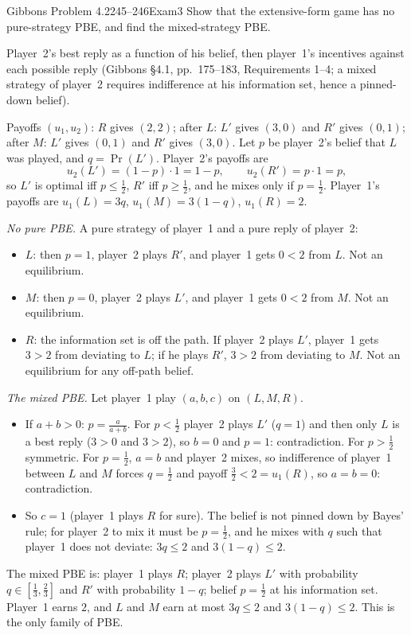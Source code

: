 \begin{exsol}{Gibbons Problem 4.2}{245--246}{Exam}{3}
\asked Show that the extensive-form game has no pure-strategy PBE, and find the mixed-strategy PBE.

\method Player~2's best reply as a function of his belief, then player~1's incentives against each
possible reply (Gibbons \S4.1, pp.~175--183, Requirements 1--4; a mixed strategy of player~2
requires indifference at his information set, hence a pinned-down belief).

\solution Payoffs $(u_1, u_2)$: $R$ gives $(2, 2)$; after $L$: $L'$ gives $(3, 0)$ and $R'$ gives
$(0, 1)$; after $M$: $L'$ gives $(0, 1)$ and $R'$ gives $(3, 0)$. Let $p$ be player~2's belief that
$L$ was played, and $q = \Pr(L')$. Player~2's payoffs are
\[
  u_2(L') = (1-p) \cdot 1 = 1 - p, \qquad u_2(R') = p \cdot 1 = p,
\]
so $L'$ is optimal iff $p \le \frac12$, $R'$ iff $p \ge \frac12$, and he mixes only if $p = \frac12$.
Player~1's payoffs are $u_1(L) = 3q$, $u_1(M) = 3(1-q)$, $u_1(R) = 2$.

\emph{No pure PBE.} A pure strategy of player~1 and a pure reply of player~2:
\begin{itemize}
  \item $L$: then $p = 1$, player~2 plays $R'$, and player~1 gets $0 < 2$ from $L$. Not an equilibrium.
  \item $M$: then $p = 0$, player~2 plays $L'$, and player~1 gets $0 < 2$ from $M$. Not an equilibrium.
  \item $R$: the information set is off the path. If player~2 plays $L'$, player~1 gets $3 > 2$
  from deviating to $L$; if he plays $R'$, $3 > 2$ from deviating to $M$. Not an equilibrium
  for any off-path belief.
\end{itemize}
\emph{The mixed PBE.} Let player~1 play $(a, b, c)$ on $(L, M, R)$.
\begin{itemize}
  \item If $a + b > 0$: $p = \frac{a}{a+b}$. For $p < \frac12$ player~2 plays $L'$ ($q = 1$) and then
  only $L$ is a best reply ($3 > 0$ and $3 > 2$), so $b = 0$ and $p = 1$: contradiction. For $p > \frac12$
  symmetric. For $p = \frac12$, $a = b$ and player~2 mixes, so indifference of player~1 between
  $L$ and $M$ forces $q = \frac12$ and payoff $\frac32 < 2 = u_1(R)$, so $a = b = 0$: contradiction.
  \item So $c = 1$ (player~1 plays $R$ for sure). The belief is not pinned down by Bayes' rule;
  for player~2 to mix it must be $p = \frac12$, and he mixes with $q$ such that player~1 does not
  deviate: $3q \le 2$ and $3(1-q) \le 2$.
\end{itemize}
The mixed PBE is: player~1 plays $R$; player~2 plays $L'$ with probability $q \in [\frac13, \frac23]$
and $R'$ with probability $1 - q$; belief $p = \frac12$ at his information set. Player~1 earns $2$,
and $L$ and $M$ earn at most $3q \le 2$ and $3(1-q) \le 2$. This is the only family of PBE.


\end{exsol}
